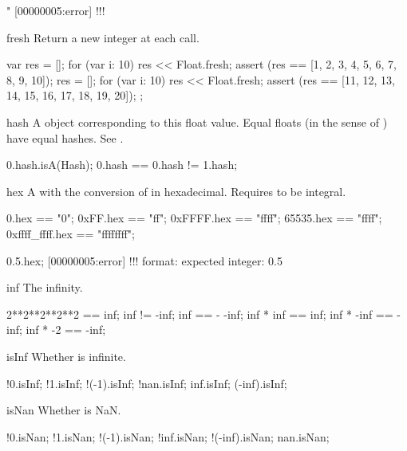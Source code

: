 \begin{urbiscriptapi}
\begin{urbiassert}
"%
[00000005:error] !!! %
\end{urbiassert}

\item[fresh]%
  Return a new integer at each call.
\begin{urbiscript}
{
  var res = [];
  for (var i: 10)
    res << Float.fresh;
  assert (res == [1, 2, 3, 4, 5, 6, 7, 8, 9, 10]);
  res = [];
  for (var i: 10)
    res << Float.fresh;
  assert (res == [11, 12, 13, 14, 15, 16, 17, 18, 19, 20]);
};
\end{urbiscript}

\item[hash] A  object corresponding to this float value.
  Equal floats (in the sense of ) have equal hashes.  See
  .

\begin{urbiassert}
0.hash.isA(Hash);
0.hash == 0.hash != 1.hash;
\end{urbiassert}

\item[hex] A  with the conversion of \this in hexadecimal.
  Requires \this to be integral.
\begin{urbiassert}
          0.hex == "0";
       0xFF.hex == "ff";
     0xFFFF.hex == "ffff";
      65535.hex == "ffff";
0xffff_ffff.hex == "ffffffff";

0.5.hex;
[00000005:error] !!! format: expected integer: 0.5
\end{urbiassert}

\item[inf]
  The infinity.
\begin{urbiassert}
2**2**2**2**2 == inf;
inf != -inf;
inf == - -inf;
inf * inf == inf;
inf * -inf == -inf;
inf * -2 == -inf;
\end{urbiassert}

\item[isInf]%
  Whether \this is infinite.
\begin{urbiassert}
    !0.isInf; !1.isInf; !(-1).isInf;
  !nan.isInf;
   inf.isInf;  (-inf).isInf;
\end{urbiassert}

\item[isNan]%
  Whether is NaN.
\begin{urbiassert}
     !0.isNan; !1.isNan; !(-1).isNan;
   !inf.isNan;  !(-inf).isNan;
    nan.isNan;
\end{urbiassert}


\end{urbiscriptapi}
